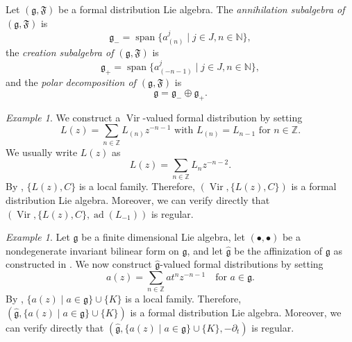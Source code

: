 \documentclass[a4paper, 12pt, reqno]{amsart}
\theoremstyle{remark}
\newtheorem{example}[theorem]{Example}
\DeclareMathOperator{\Vir}{Vir}
\DeclareMathOperator{\vspan}{span}
\DeclareMathOperator{\ad}{ad}
\begin{document}
Let $(\mathfrak{g}, \mathfrak{F})$ be a formal distribution Lie algebra.
The \emph{annihilation subalgebra of $(\mathfrak{g}, \mathfrak{F})$} is
\begin{equation*}
  \mathfrak{g}_- = \vspan\{a^j_{(n)} \mid j \in J, n \in \mathbb{N}\},
\end{equation*}
the \emph{creation subalgebra of $(\mathfrak{g}, \mathfrak{F})$} is
\begin{equation*}
  \mathfrak{g}_+ = \vspan\{a^j_{(-n - 1)} \mid j \in J, n \in \mathbb{N}\},
\end{equation*}
and the \emph{polar decomposition of $(\mathfrak{g}, \mathfrak{F})$} is
\begin{equation*}
  \mathfrak{g} = \mathfrak{g}_- \oplus \mathfrak{g}_+.
\end{equation*}

\begin{example}
  \label{exa:9}
  We construct a $\Vir$-valued formal distribution by setting
  \begin{equation*}
    \text{$L(z) = \sum_{n \in \mathbb{Z}}L_{(n)}z^{-n - 1}$ with $L_{(n)} = L_{n - 1}$ for $n \in \mathbb{Z}$}.
  \end{equation*}
  We usually write $L(z)$ as
  \begin{equation*}
    L(z) = \sum_{n \in \mathbb{Z}}L_nz^{-n - 2}.
  \end{equation*}
  By \cite[\S2]{frenkel_vertex_2001}, $\{L(z), C\}$ is a local family.
  Therefore, $(\Vir, \{L(z), C\})$ is a formal distribution Lie algebra.
  Moreover, we can verify directly that $(\Vir, \{L(z), C\}, \ad(L_{-1}))$ is regular.
\end{example}

\begin{example}
  \label{exa:10}
  Let $\mathfrak{g}$ be a finite dimensional Lie algebra, let $(\bullet, \bullet)$ be a nondegenerate invariant bilinear form on $\mathfrak{g}$, and let $\hat{\mathfrak{g}}$ be the affinization of $\mathfrak{g}$ as constructed in .
  We now construct $\hat{\mathfrak{g}}$-valued formal distributions by setting
  \begin{equation*}
    a(z) = \sum_{n \in \mathbb{Z}}at^nz^{-n - 1} \quad \text{for $a \in \mathfrak{g}$}.
  \end{equation*}
  By \cite[\S2]{frenkel_vertex_2001}, $\{a(z) \mid a \in \mathfrak{g}\} \cup \{K\}$ is a local family.
  Therefore, $(\hat{\mathfrak{g}}, \{a(z) \mid a \in \mathfrak{g}\} \cup \{K\})$ is a formal distribution Lie algebra.
  Moreover, we can verify directly that $(\hat{\mathfrak{g}}, \{a(z) \mid a \in \mathfrak{g}\} \cup \{K\}, -\partial_t)$ is regular.
\end{example}
\end{document}
